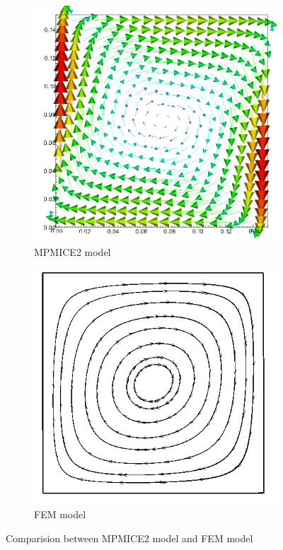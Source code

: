 \documentclass[preprint,12pt]{elsarticle}
\begin{document}
\begin{figure}
\center
\begin{subfigure}[c]{0.5\linewidth}
\includegraphics[width=\linewidth]{thermal.png}
\caption{MPMICE2 model}
\end{subfigure}\hfill    
\begin{subfigure}[d]{0.5\linewidth}
\includegraphics[width=\linewidth]{velocity_thermal-1.jpg}
\caption{FEM model}
\end{subfigure}
\caption{Comparision between MPMICE2 model and FEM model}
\label{fig:thermal}
\end{figure}
\end{document}
